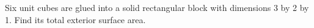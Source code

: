 Six unit cubes are glued into a solid rectangular block with dimensions 3 by 2 by 1. Find its total exterior surface area.
